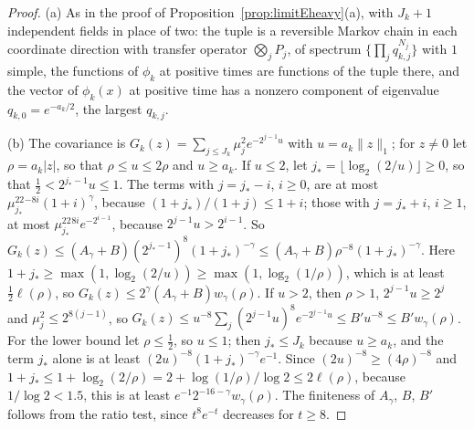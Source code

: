 \documentclass[aps,prd,twocolumn,superscriptaddress,nofootinbib,longbibliography,floatfix,amsmath,amssymb,10pt]{revtex4-2}
\theoremstyle{definition}
\theoremstyle{remark}
\begin{document}
\begin{proof}
(a) As in the proof of Proposition~\ref{prop:limitEheavy}(a), with $J_k+1$
independent fields in place of two: the tuple is a reversible Markov chain
in each coordinate direction with transfer operator $\bigotimes_jP_j$, of
spectrum $\{\prod_jq_{k,j}^{N_j}\}$ with $1$ simple, the functions of
$\phi_k$ at positive times are functions of the tuple there, and the vector
of $\phi_k(x)$ at positive time has a nonzero component of eigenvalue
$q_{k,0}=e^{-a_k/2}$, the largest $q_{k,j}$.

(b) The covariance is $G_k(z)=\sum_{j\le J_k}\mu_j^2e^{-2^{j-1}u}$ with
$u=a_k\|z\|_1$; for $z\ne0$ let $\rho=a_k|z|$, so that $\rho\le u\le2\rho$
and $u\ge a_k$. If $u\le2$, let $j_*=\lfloor\log_2(2/u)\rfloor\ge0$, so that
$\frac12<2^{j_*-1}u\le1$. The terms with $j=j_*-i$, $i\ge0$, are at most
$\mu_{j_*}^22^{-8i}(1+i)^\gamma$, because $(1+j_*)/(1+j)\le1+i$; those with
$j=j_*+i$, $i\ge1$, at most $\mu_{j_*}^22^{8i}e^{-2^{i-1}}$, because
$2^{j-1}u>2^{i-1}$. So $G_k(z)\le(A_\gamma+B)(2^{j_*-1})^8(1+j_*)^{-\gamma}
\le(A_\gamma+B)\rho^{-8}(1+j_*)^{-\gamma}$. Here $1+j_*\ge\max(1,\log_2(2/u))
\ge\max(1,\log_2(1/\rho))$, which is at least $\frac12\ell(\rho)$, so
$G_k(z)\le2^\gamma(A_\gamma+B)w_\gamma(\rho)$. If $u>2$, then $\rho>1$,
$2^{j-1}u\ge2^j$ and $\mu_j^2\le2^{8(j-1)}$, so $G_k(z)\le u^{-8}\sum_j
(2^{j-1}u)^8e^{-2^{j-1}u}\le B'u^{-8}\le B'w_\gamma(\rho)$. For the lower
bound let $\rho\le\frac12$, so $u\le1$; then $j_*\le J_k$ because $u\ge a_k$,
and the term $j_*$ alone is at least $(2u)^{-8}(1+j_*)^{-\gamma}e^{-1}$.
Since $(2u)^{-8}\ge(4\rho)^{-8}$ and $1+j_*\le1+\log_2(2/\rho)=2+\log(1/\rho)/
\log2\le2\ell(\rho)$, because $1/\log2<1.5$, this is at least $e^{-1}
2^{-16-\gamma}w_\gamma(\rho)$. The finiteness of $A_\gamma$, $B$, $B'$
follows from the ratio test, since $t^8e^{-t}$ decreases for $t\ge8$.


\end{proof}
\end{document}
